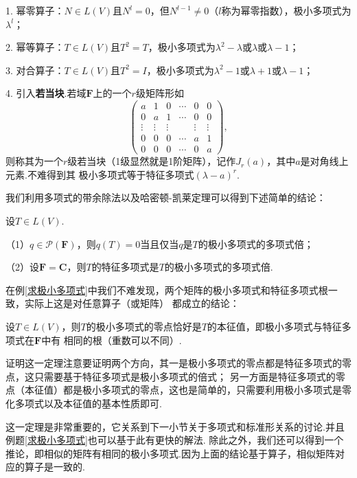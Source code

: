 1. 幂零算子：$N\in L(V)$且$N^l=0$，但$N^{l-1}\neq 0$（$l$称为幂零指数），极小多项式为$\lambda^l$；

2. 幂等算子：$T\in L(V)$且$T^2=T$，极小多项式为$\lambda^2-\lambda$或$\lambda$或$\lambda-1$；

3. 对合算子：$T\in L(V)$且$T^2=I$，极小多项式为$\lambda^2-1$或$\lambda+1$或$\lambda-1$；

4. 引入\textbf{若当块}.若域$\mathbf{F}$上的一个$r$级矩阵形如$$\begin{pmatrix}
	a & 1 & 0 & \cdots & 0 & 0 \\
	0 & a & 1 & \cdots & 0 & 0 \\
	\vdots & \vdots & \vdots &  & \vdots & \vdots \\
	0 & 0 & 0 & \cdots & a & 1 \\
	0 & 0 & 0 & \cdots & 0 & a
\end{pmatrix},$$
则称其为一个$r$级若当块（1级显然就是1阶矩阵），记作$J_r(a)$，其中$a$是对角线上元素.不难得到其
极小多项式等于特征多项式$(\lambda-a)^r$.

我们利用多项式的带余除法以及哈密顿-凯莱定理可以得到下述简单的结论：
\begin{theorem}
	设$T\in L(V)$.
	
	\textup{（1）}$q\in\mathcal{P}(\mathbf{F})$，则$q(T)=0$当且仅当$q$是$T$的极小多项式的多项式倍；

	\textup{（2）}设$\mathbf{F}=\mathbf{C}$，则$T$的特征多项式是$T$的极小多项式的多项式倍.
\end{theorem}
在例\ref{求极小多项式}中我们不难发现，两个矩阵的极小多项式和特征多项式根一致，实际上这是对任意算子（或矩阵）
都成立的结论：
\begin{theorem}\label{极小与特征根相同}
	设$T\in L(V)$，则$T$的极小多项式的零点恰好是$T$的本征值，即极小多项式与特征多项式在$\mathbf{F}$中有
	相同的根（重数可以不同）.
\end{theorem}
证明这一定理注意要证明两个方向，其一是极小多项式的零点都是特征多项式的零点，这只需要基于特征多项式是极小多项式的倍式；
另一方面是特征多项式的零点（本征值）都是极小多项式的零点，这也是简单的，只需要利用极小多项式是零化多项式以及本征值的基本性质即可.

这一定理是非常重要的，它关系到下一小节关于多项式和标准形关系的讨论.并且例题\ref{求极小多项式}也可以基于此有更快的解法.
除此之外，我们还可以得到一个推论，即相似的矩阵有相同的极小多项式.因为上面的结论基于算子，相似矩阵对应的算子是一致的.

